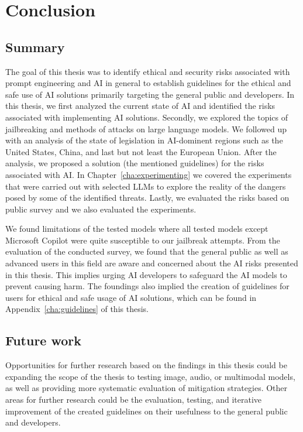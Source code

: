 \chapter{Conclusion}

\section{Summary}

The goal of this thesis was to identify ethical and security risks associated with prompt engineering and AI in general to establish guidelines for the ethical and safe use of AI solutions primarily targeting the general public and developers. In this thesis, we first analyzed the current state of AI and identified the risks associated with implementing AI solutions. Secondly, we explored the topics of jailbreaking and methods of attacks on large language models. We followed up with an analysis of the state of legislation in AI-dominent regions such as the United States, China, and last but not least the European Union. After the analysis, we proposed a solution (the mentioned guidelines) for the risks associated with AI. In Chapter~\ref{cha:experimenting} we covered the experiments that were carried out with selected LLMs to explore the reality of the dangers posed by some of the identified threats. Lastly, we evaluated the risks based on public survey and we also evaluated the experiments. 

We found limitations of the tested models where all tested models except Microsoft Copilot were quite susceptible to our jailbreak attempts. From the evaluation of the conducted survey, we found that the general public as well as advanced users in this field are aware and concerned about the AI risks presented in this thesis. This implies urging AI developers to safeguard the AI models to prevent causing harm. The foundings also implied the creation of guidelines for users for ethical and safe usage of AI solutions, which can be found in Appendix~\ref{cha:guidelines} of this thesis.

\section{Future work}

Opportunities for further research based on the findings in this thesis could be expanding the scope of the thesis to testing image, audio, or multimodal models, as well as providing more systematic evaluation of mitigation strategies. Other areas for further research could be the evaluation, testing, and iterative improvement of the created guidelines on their usefulness to the general public and developers.
